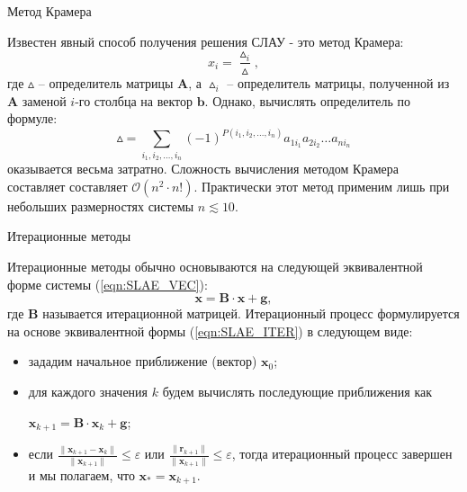 \documentclass[10pt,xcolor=pst,aspectratio=169]{beamer}
\begin{document}
\begin{frame}{Метод Крамера}

	\transdissolve[duration=0.2]
	\justifying
	Известен явный способ получения решения СЛАУ - это метод Крамера:
	\[
		x_{i} = \frac{\vartriangle_{i}}{\vartriangle},
	\]
	где $\vartriangle$ -- определитель матрицы $\textbf{A}$, а $\vartriangle_{i}$ -- определитель матрицы, полученной из $\textbf{A}$ заменой $i$-го столбца на вектор $\textbf{b}$.
	Однако, вычислять определитель по формуле:
	\[
		\vartriangle = \sum_{i_1, i_2, \ldots, i_n} (-1)^{P(i_1, i_2, \ldots, i_n)} a_{1 i_1} a_{2 i_2} \ldots a_{n i_n}
	\]
	оказывается весьма затратно. Сложность вычисления методом Крамера составляет составляет $\mathcal{O} (n^2 \cdot n!)$. Практически этот метод применим лишь при небольших размерностях системы $n \lesssim 10$.

\end{frame}

\begin{frame}{Итерационные методы}

	\transdissolve[duration=0.2]
	\justifying
	Итерационные методы обычно основываются на следующей эквивалентной форме системы (\ref{eqn:SLAE_VEC}):
	\begin{equation}
		\textbf{x} = \textbf{B} \cdot \textbf{x} + \textbf{g},
		\label{eqn:SLAE_ITER}
	\end{equation}
	где $\textbf{B}$ называется итерационной матрицей.
	Итерационный процесс формулируется на основе эквивалентной формы (\ref{eqn:SLAE_ITER}) в следующем виде:
	\begin{itemize}
		\item зададим начальное приближение (вектор) $\textbf{x}_{0}$;
		\item для каждого значения $k$ будем вычислять последующие приближения как
		\begin{center}
			$\textbf{x}_{k+1} = \textbf{B} \cdot \textbf{x}_{k} + \textbf{g}$;
		\end{center}
		\item если $\frac{\parallel \textbf{x}_{k+1} - \textbf{x}_{k} \parallel}{\parallel \textbf{x}_{k+1} \parallel} \leq \varepsilon$ или $\frac{\parallel \textbf{r}_{k+1} \parallel}{\parallel \textbf{x}_{k+1} \parallel} \leq \varepsilon$, тогда итерационный процесс завершен и мы полагаем, что $\textbf{x}_{\ast} = \textbf{x}_{k+1}$.
	\end{itemize}

\end{frame}
\end{document}
